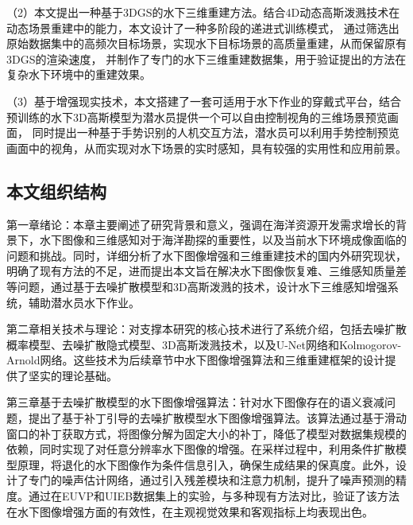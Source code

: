 （2）本文提出一种基于3DGS的水下三维重建方法。结合4D动态高斯泼溅技术在动态场景重建中的能力，本文设计了一种多阶段的递进式训练模式，
通过筛选出原始数据集中的高频次目标场景，实现水下目标场景的高质量重建，从而保留原有3DGS的渲染速度，
并制作了专门的水下三维重建数据集，用于验证提出的方法在复杂水下环境中的重建效果。

（3）基于增强现实技术，本文搭建了一套可适用于水下作业的穿戴式平台，结合预训练的水下3D高斯模型为潜水员提供一个可以自由控制视角的三维场景预览画面，
同时提出一种基于手势识别的人机交互方法，潜水员可以利用手势控制预览画面中的视角，从而实现对水下场景的实时感知，具有较强的实用性和应用前景。




\subsection{本文组织结构}
第一章绪论：本章主要阐述了研究背景和意义，强调在海洋资源开发需求增长的背景下，水下图像和三维感知对于海洋勘探的重要性，以及当前水下环境成像面临的问题和挑战。同时，详细分析了水下图像增强和三维重建技术的国内外研究现状，明确了现有方法的不足，进而提出本文旨在解决水下图像恢复难、三维感知质量差等问题，通过基于去噪扩散模型和3D高斯泼溅的技术，设计水下三维感知增强系统，辅助潜水员水下作业。

第二章相关技术与理论：对支撑本研究的核心技术进行了系统介绍，包括去噪扩散概率模型、去噪扩散隐式模型、3D高斯泼溅技术，以及U-Net网络和Kolmogorov-Arnold网络。这些技术为后续章节中水下图像增强算法和三维重建框架的设计提供了坚实的理论基础。

第三章基于去噪扩散模型的水下图像增强算法：针对水下图像存在的语义衰减问题，提出了基于补丁引导的去噪扩散模型水下图像增强算法。该算法通过基于滑动窗口的补丁获取方式，将图像分解为固定大小的补丁，降低了模型对数据集规模的依赖，同时实现了对任意分辨率水下图像的增强。在采样过程中，利用条件扩散模型原理，将退化的水下图像作为条件信息引入，确保生成结果的保真度。此外，设计了专门的噪声估计网络，通过引入残差模块和注意力机制，提升了噪声预测的精度。通过在EUVP和UIEB数据集上的实验，与多种现有方法对比，验证了该方法在水下图像增强方面的有效性，在主观视觉效果和客观指标上均表现出色。

